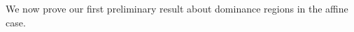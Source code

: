 \documentclass{amsart}
\newtheorem{lemma}[proposition]{Lemma}
\theoremstyle{definition}
\theoremstyle{remark}
\numberwithin{equation}{section}
\newcommand{\set}[1]{{\lbrace #1 \rbrace}}
\newcommand{\br}[1]{{\langle #1 \rangle}}
\newcommand{\brr}[1]{{\bigl\langle #1 \bigr\rangle}}
\newcommand{\0}{{\mathbf{0}}}
\newcommand{\fin}{\mathrm{fin}}
\newcommand{\RSChar}{\Phi}
\newcommand{\RS}{\RSChar}
\newcommand{\RSfin}{\RS_\fin}
\begin{document}
%

We now prove our first preliminary result about dominance regions in the affine case.
\end{document}
